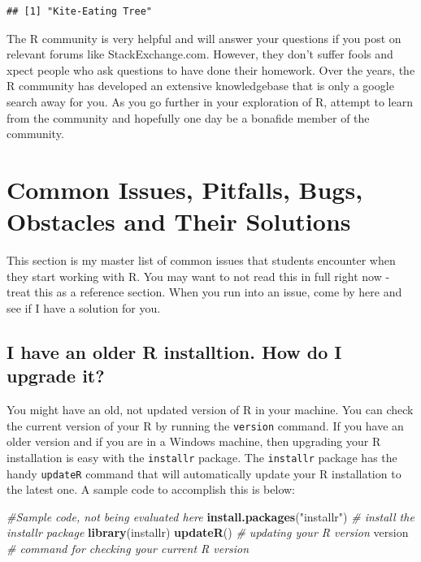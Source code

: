 \documentclass[]{krantz}
\makeatletter
\newenvironment{Shaded}{\begin{snugshade}}{\end{snugshade}}
\newcommand{\KeywordTok}[1]{\textcolor[rgb]{0.27,0.27,0.27}{\textbf{#1}}}
\newcommand{\StringTok}[1]{\textcolor[rgb]{0.5,0.5,0.5}{#1}}
\newcommand{\CommentTok}[1]{\textcolor[rgb]{0.56,0.35,0.01}{\textit{#1}}}
\newcommand{\OperatorTok}[1]{\textcolor[rgb]{0.81,0.36,0.00}{\textbf{#1}}}
\newcommand{\NormalTok}[1]{#1}
\newenvironment{kframe}{%
\medskip{}
\setlength{\fboxsep}{.8em}
 \def\at@end@of@kframe{}%
 \ifinner\ifhmode%
  \def\at@end@of@kframe{\end{minipage}}%
  \begin{minipage}{\columnwidth}%
 \fi\fi%
 \def\FrameCommand##1{\hskip\@totalleftmargin \hskip-\fboxsep
 \colorbox{shadecolor}{##1}\hskip-\fboxsep
     \hskip-\linewidth \hskip-\@totalleftmargin \hskip\columnwidth}%
 \MakeFramed {\advance\hsize-\width
   \@totalleftmargin\z@ \linewidth\hsize
   \@setminipage}}%
 {\par\unskip\endMakeFramed%
 \at@end@of@kframe}
\renewenvironment{Shaded}{\begin{kframe}}{\end{kframe}}
\theoremstyle{definition}
\theoremstyle{definition}
\theoremstyle{definition}
\theoremstyle{remark}
\makeatother
\begin{document}
\begin{Shaded}
\end{Shaded}

\begin{verbatim}
## [1] "Kite-Eating Tree"
\end{verbatim}

The R community is very helpful and will answer your questions if you
post on relevant forums like StackExchange.com. However, they don't
suffer fools and xpect people who ask questions to have done their
homework. Over the years, the R community has developed an extensive
knowledgebase that is only a google search away for you. As you go
further in your exploration of R, attempt to learn from the community
and hopefully one day be a bonafide member of the community.

\section{Common Issues, Pitfalls, Bugs, Obstacles and Their
Solutions}\label{common-issues-pitfalls-bugs-obstacles-and-their-solutions}

This section is my master list of common issues that students encounter
when they start working with R. You may want to not read this in full
right now - treat this as a reference section. When you run into an
issue, come by here and see if I have a solution for you.

\subsection{I have an older R installtion. How do I upgrade
it?}\label{i-have-an-older-r-installtion.-how-do-i-upgrade-it}

You might have an old, not updated version of R in your machine. You can
check the current version of your R by running the \texttt{version}
command. If you have an older version and if you are in a Windows
machine, then upgrading your R installation is easy with the
\texttt{installr} package. The \texttt{installr} package has the handy
\texttt{updateR} command that will automatically update your R
installation to the latest one. A sample code to accomplish this is
below:

\begin{Shaded}
\begin{Highlighting}[]
\CommentTok{#Sample code, not being evaluated here}
\KeywordTok{install.packages}\NormalTok{(}\StringTok{"installr"}\NormalTok{) }\CommentTok{# install the installr package }
\KeywordTok{library}\NormalTok{(installr)}
\KeywordTok{updateR}\NormalTok{() }\CommentTok{# updating your R version}
\NormalTok{version }\CommentTok{# command for checking your current R version}
\end{Highlighting}
\end{Shaded}
\end{document}
